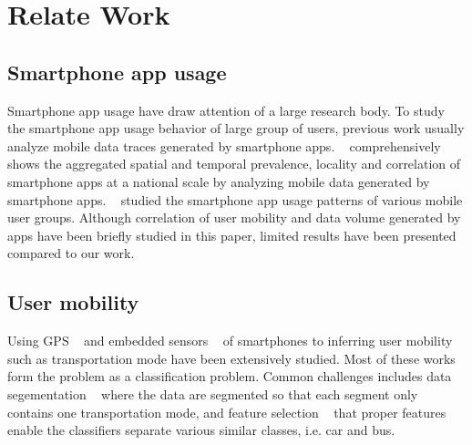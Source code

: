 \section{Relate Work}

\subsection {Smartphone app usage}
Smartphone app usage have draw attention of a large research body. To study the smartphone app usage behavior of large group of users, previous work usually analyze mobile data traces generated by smartphone apps. ~\cite{xu2011identifying} comprehensively shows the aggregated spatial and temporal prevalence, locality and correlation of smartphone apps at a national scale by analyzing mobile data generated by smartphone apps. ~\cite{yang2015characterizing} studied the smartphone app usage patterns of various mobile user groups. Although correlation of user mobility and data volume generated by apps have been briefly studied in this paper, limited results have been presented compared to our work.

\subsection{User mobility}
Using GPS ~\cite{6958169, 6450942, zheng2010understanding, biljecki2013transportation, stenneth2011transportation, 5283030, 6460199, Reddy:2010:UMP:1689239.1689243} and embedded sensors ~\cite{6958169, wang2010accelerometer, shin2015urban, manzoni2010transportation, 6038808, Reddy:2010:UMP:1689239.1689243, Hemminki:2013:ATM:2517351.2517367} of smartphones to inferring user mobility such as transportation mode have been extensively studied. Most of these works form the problem as a classification problem. Common challenges includes data segementation ~\cite{6958169, 6450942, zheng2010understanding, biljecki2013transportation} where the data are segmented so that each segment only contains one transportation mode, and feature selection ~\cite{zheng2010understanding, biljecki2013transportation, wang2010accelerometer, stenneth2011transportation} that proper features enable the classifiers separate various similar classes, i.e. car and bus. 


